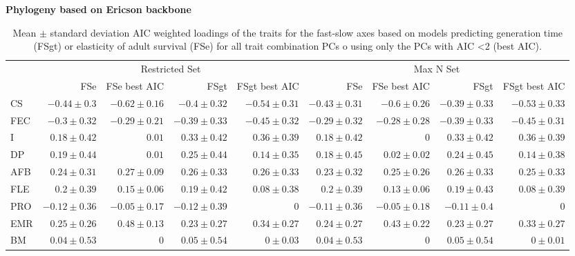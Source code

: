 \begin{landscape}%
\begin{table}
\center
\caption[LHT loadings of the FS axes]{
Mean $\pm$ standard deviation AIC weighted loadings of the traits for the
fast-slow axes based on models predicting generation time (FSgt) or elasticity
of adult survival (FSe) for all trait combination PCs o using only the PCs with
AIC \textless{2} (best AIC).
}
\label{tab:tabApp2.2}
\begin{footnotesize}

\textbf{Phylogeny based on Ericson backbone}

\begin{tabular}{@{}l|rrrr|rrrr@{}}
\toprule
  & \multicolumn{4}{c|}{Restricted Set} & \multicolumn{4}{c}{Max N Set}\\
  & FSe & FSe best AIC & FSgt & FSgt best AIC & FSe & FSe best AIC & FSgt & FSgt best AIC\\
\midrule
CS & $-0.44 \pm 0.3$ & $-0.62 \pm 0.16$ & $-0.4 \pm 0.32$ & $-0.54 \pm 0.31$ & $-0.43 \pm 0.31$ & $-0.6 \pm 0.26$ & $-0.39 \pm 0.33$ & $-0.53 \pm 0.33$\\
FEC & $-0.3 \pm 0.32$ & $-0.29 \pm 0.21$ & $-0.39 \pm 0.33$ & $-0.45 \pm 0.32$ & $-0.29 \pm 0.32$ & $-0.28 \pm 0.28$ & $-0.39 \pm 0.33$ & $-0.45 \pm 0.31$\\
I & $0.18 \pm 0.42$ & $0.01$ & $0.33 \pm 0.42$ & $0.36 \pm 0.39$ & $0.18 \pm 0.42$ & $0$ & $0.33 \pm 0.42$ & $0.36 \pm 0.39$\\
DP & $0.19 \pm 0.44$ & $0.01$ & $0.25 \pm 0.44$ & $0.14 \pm 0.35$ & $0.18 \pm 0.45$ & $0.02 \pm 0.02$ & $0.24 \pm 0.45$ & $0.14 \pm 0.38$\\
AFB & $0.24 \pm 0.31$ & $0.27 \pm 0.09$ & $0.26 \pm 0.33$ & $0.26 \pm 0.33$ & $0.23 \pm 0.32$ & $0.25 \pm 0.26$ & $0.26 \pm 0.33$ & $0.25 \pm 0.33$\\
FLE & $0.2 \pm 0.39$ & $0.15 \pm 0.06$ & $0.19 \pm 0.42$ & $0.08 \pm 0.38$ & $0.2 \pm 0.39$ & $0.13 \pm 0.06$ & $0.19 \pm 0.43$ & $0.08 \pm 0.39$\\
PRO & $-0.12 \pm 0.36$ & $-0.05 \pm 0.17$ & $-0.12 \pm 0.39$ & $0$ & $-0.11 \pm 0.36$ & $-0.05 \pm 0.18$ & $-0.11 \pm 0.4$ & $0$\\
EMR & $0.25 \pm 0.26$ & $0.48 \pm 0.13$ & $0.23 \pm 0.27$ & $0.34 \pm 0.27$ & $0.24 \pm 0.27$ & $0.43 \pm 0.22$ & $0.23 \pm 0.27$ & $0.33 \pm 0.27$\\
BM & $0.04 \pm 0.53$ & $0$ & $0.05 \pm 0.54$ & $0 \pm 0.03$ & $0.04 \pm 0.53$ & $0$ & $0.05 \pm 0.54$ & $0 \pm 0.01$\\

\end{tabular}
\end{footnotesize}
\end{table}
\end{landscape}
